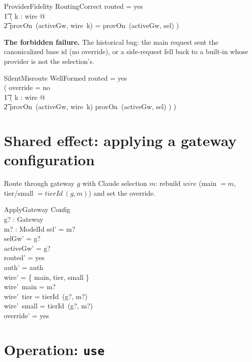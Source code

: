 \documentclass{article}
\begin{document}
\begin{schema}{ProviderFidelity}
  RoutingCorrect
\where
  routed = yes \implies \\
  \t1 ( \forall k : \dom wire @ \\
  \t2   provOn~(activeGw, wire~k) = provOn~(activeGw, sel) )
\end{schema}

\textbf{The forbidden failure.} The historical bug: the main request sent the
canonicalized base id (no override), or a side-request fell back to a built-in
whose provider is not the selection's.

\begin{schema}{SilentMisroute}
  WellFormed
\where
  routed = yes \\
  ( override = no \lor \\
  \t1 ( \exists k : \dom wire @ \\
  \t2   provOn~(activeGw, wire~k) \neq provOn~(activeGw, sel) ) )
\end{schema}

\section{Shared effect: applying a gateway configuration}

Route through gateway $g$ with Claude selection $m$: rebuild $wire$ (main $= m$,
tier/small $= tierId~(g,m)$) and set the override.

\begin{schema}{ApplyGateway}
  \Delta Config \\
  g? : Gateway \\
  m? : ModelId
\where
  sel' = m? \\
  selGw' = g? \\
  activeGw' = g? \\
  routed' = yes \\
  auth' = auth \\
  \dom wire' = \{ main, tier, small \} \\
  wire'~main = m? \\
  wire'~tier = tierId~(g?, m?) \\
  wire'~small = tierId~(g?, m?) \\
  override' = yes
\end{schema}

\section{Operation: \texttt{use}}
\end{document}
